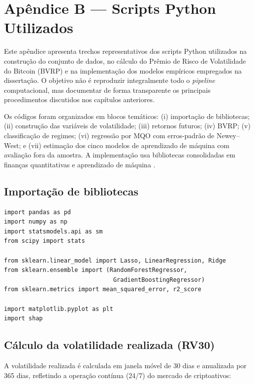 ﻿\chapter{Apêndice B --- Scripts Python Utilizados}
\label{apendiceB}

Este apêndice apresenta trechos representativos dos scripts Python utilizados na
construção do conjunto de dados, no cálculo do Prêmio de Risco de Volatilidade do
Bitcoin (BVRP) e na implementação dos modelos empíricos empregados na dissertação.
O objetivo não é reproduzir integralmente todo o \textit{pipeline} computacional,
mas documentar de forma transparente os principais procedimentos discutidos nos
capítulos anteriores.

Os códigos foram organizados em blocos temáticos: (i) importação de bibliotecas;
(ii) construção das variáveis de volatilidade; (iii) retornos futuros; (iv) BVRP;
(v) classificação de regimes; (vi) regressão por MQO com erros-padrão de Newey--West;
e (vii) estimação dos cinco modelos de aprendizado de máquina com avaliação fora
da amostra. A implementação usa bibliotecas consolidadas em finanças quantitativas e
aprendizado de máquina \citep{andersen2003realized, corsi2009har,
breiman2001randomforest, friedman2001gradientboosting, Gu2020EmpiricalML}.

\section{Importação de bibliotecas}

\begin{verbatim}
import pandas as pd
import numpy as np
import statsmodels.api as sm
from scipy import stats

from sklearn.linear_model import Lasso, LinearRegression, Ridge
from sklearn.ensemble import (RandomForestRegressor,
                               GradientBoostingRegressor)
from sklearn.metrics import mean_squared_error, r2_score

import matplotlib.pyplot as plt
import shap
\end{verbatim}

\section{Cálculo da volatilidade realizada (RV30)}

A volatilidade realizada é calculada em janela móvel de 30 dias e anualizada por
365 dias, refletindo a operação contínua (24/7) do mercado de criptoativos:

